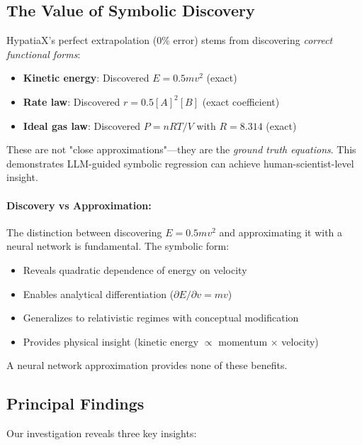 \documentclass[twoside,11pt]{article}
\begin{document}
\subsection{The Value of Symbolic Discovery}\citep{koza1994genetic}

HypatiaX's perfect extrapolation (0\% error) stems from discovering \emph{correct functional forms}:

\begin{itemize}
\item \textbf{Kinetic energy}: Discovered $E = 0.5mv^2$ (exact)
\item \textbf{Rate law}: Discovered $r = 0.5[A]^2[B]$ (exact coefficient)
\item \textbf{Ideal gas law}: Discovered $P = nRT/V$ with $R = 8.314$ (exact)
\end{itemize}

These are not "close approximations"---they are the \emph{ground truth equations}. This demonstrates LLM-guided symbolic regression can achieve human-scientist-level insight\citep{la2021contemporary}\citep{kambhampati2024llms}.

\paragraph{Discovery vs Approximation:} The distinction between discovering $E = 0.5mv^2$ and approximating it with a neural network is fundamental\citep{koza1994genetic}. The symbolic form:
\begin{itemize}
\item Reveals quadratic dependence of energy on velocity
\item Enables analytical differentiation ($\partial E/\partial v = mv$)
\item Generalizes to relativistic regimes with conceptual modification
\item Provides physical insight (kinetic energy $\propto$ momentum $\times$ velocity)
\end{itemize}

A neural network approximation provides none of these benefits.


\subsection{Principal Findings}

Our investigation reveals three key insights:
\end{document}
